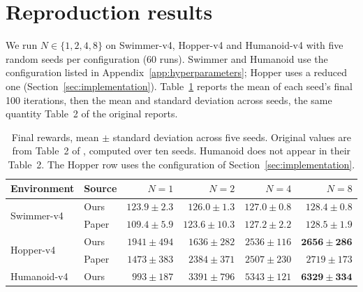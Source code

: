 \section{Reproduction results}
\label{sec:reproduction}

We run $N \in \{1,2,4,8\}$ on Swimmer-v4, Hopper-v4 and Humanoid-v4 with five
random seeds per configuration (60 runs). Swimmer and Humanoid use the
configuration listed in Appendix~\ref{app:hyperparameters}; Hopper uses a
reduced one (Section~\ref{sec:implementation}).
Table~\ref{tab:reproduction} reports
the mean of each seed's final 100 iterations, then the mean and standard
deviation across seeds, the same quantity Table~2 of the original reports.

\begin{table}[t]
  \centering
  \caption{Final rewards, mean $\pm$ standard deviation across five seeds.
  Original values are from Table~2 of \citet{lan2023fednpgadmm}, computed over
  ten seeds. Humanoid does not appear in their Table~2. The Hopper row uses the
  configuration of Section~\ref{sec:implementation}.}
  \label{tab:reproduction}
  \begin{tabular}{llrrrr}
    \toprule
    Environment & Source & $N=1$ & $N=2$ & $N=4$ & $N=8$ \\
    \midrule
    \multirow{2}{*}{Swimmer-v4}
      & Ours  & $\mathbf{123.9 \pm 2.3}$ & $126.0 \pm 1.3$ & $127.0 \pm 0.8$ & $\mathbf{128.4 \pm 0.8}$ \\
      & Paper & $109.4 \pm 5.9$  & $123.6 \pm 10.3$ & $127.2 \pm 2.2$ & $128.5 \pm 1.9$ \\
    \midrule
    \multirow{2}{*}{Hopper-v4}
      & Ours  & $1941 \pm 494$ & $1636 \pm 282$ & $2536 \pm 116$ & $\mathbf{2656 \pm 286}$ \\
      & Paper & $1473 \pm 383$ & $2384 \pm 371$ & $2507 \pm 230$ & $2719 \pm 173$ \\
    \midrule
    Humanoid-v4
      & Ours  & $993 \pm 187$ & $3391 \pm 796$ & $5343 \pm 121$ & $\mathbf{6329 \pm 334}$ \\
    \bottomrule
  \end{tabular}
\end{table}

